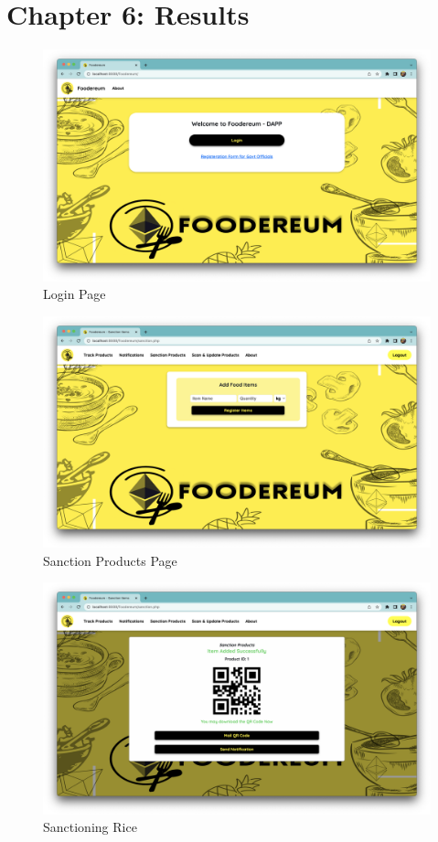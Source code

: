 \documentclass[12pt,a4paper,twocolumn,fleqn]{article}
\begin{document}
\section{Chapter 6: Results} 
\begin{figure} [H]
\includegraphics[width=15cm]{media/Login_Page.png}
\centering
\caption{Login Page}
\end{figure}
\begin{figure} [H]
\includegraphics[width=15cm]{media/Sanction_Product.png}
\centering
\caption{Sanction Products Page}
\end{figure}
\begin{figure} [H]
\includegraphics[width=15cm]{media/Rice_Sanctioned.png}
\centering
\caption{Sanctioning Rice}
\end{figure}
\end{document}
